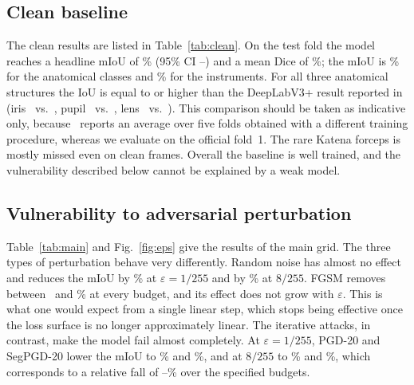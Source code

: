 \documentclass[conference]{IEEEtran}
\newcommand{\eps}{\varepsilon}
\begin{document}
\subsection{Clean baseline}
The clean results are listed in Table~\ref{tab:clean}. On the test fold the model reaches a headline mIoU of \nCleanMIoU\% (95\% CI \nCleanLo--\nCleanHi) and a mean Dice of \nCleanMDice\%; the mIoU is \nCleanAnat\% for the anatomical classes and \nCleanInst\% for the instruments. For all three anatomical structures the IoU is equal to or higher than the DeepLabV3+ result reported in~\cite{ghamsarian2024cataract} (iris \nOurIris\ vs.\ \nRefIris, pupil \nOurPupil\ vs.\ \nRefPupil, lens \nOurLens\ vs.\ \nRefLens). This comparison should be taken as indicative only, because~\cite{ghamsarian2024cataract} reports an average over five folds obtained with a different training procedure, whereas we evaluate on the official fold~1. The rare Katena forceps is mostly missed even on clean frames. Overall the baseline is well trained, and the vulnerability described below cannot be explained by a weak model.

\begin{table}[t]
\centering
\caption{Clean results on the held-out test fold (561 frames). IoU and Dice in \%; Frames is the number of test frames that contain the class. Ref.: DeepLabV3+ result reported in~\cite{ghamsarian2024cataract} (mean over five folds). $^\ast$Rare class, not included in the means.}
\label{tab:clean}
\footnotesize
\setlength{\tabcolsep}{4pt}

\end{table}

\subsection{Vulnerability to adversarial perturbation}
Table~\ref{tab:main} and Fig.~\ref{fig:eps} give the results of the main grid. The three types of perturbation behave very differently. Random noise has almost no effect and reduces the mIoU by \nNoiseOneFall\% at $\eps=1/255$ and by \nNoiseEightFall\% at $8/255$. FGSM removes between \nFGSMFallMin\ and \nFGSMFallMax\% at every budget, and its effect does not grow with $\eps$. This is what one would expect from a single linear step, which stops being effective once the loss surface is no longer approximately linear. The iterative attacks, in contrast, make the model fail almost completely. At $\eps=1/255$, PGD-20 and SegPGD-20 lower the mIoU to \nPGDOne\% and \nSegOne\%, and at $8/255$ to \nPGDEight\% and \nSegEight\%, which corresponds to a relative fall of \nIterFallMin--\nIterFallMax\% over the specified budgets.
\end{document}
